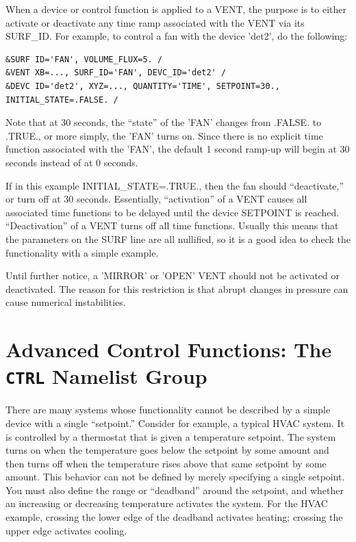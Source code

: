 \documentclass[11pt]{book}
\begin{document}
When a device or control function is applied to a {\ct VENT}, the purpose is to either activate or deactivate any time ramp associated with
the {\ct VENT} via its {\ct SURF\_ID}. For example, to control a fan with the device {\ct 'det2'}, do the following:

\footnotesize
\begin{verbatim}
&SURF ID='FAN', VOLUME_FLUX=5. /
&VENT XB=..., SURF_ID='FAN', DEVC_ID='det2' /
&DEVC ID='det2', XYZ=..., QUANTITY='TIME', SETPOINT=30., INITIAL_STATE=.FALSE. /
\end{verbatim}
\normalsize

\noindent
Note that at 30 seconds, the ``state'' of the {\ct 'FAN'} changes from {\ct .FALSE.} to {\ct .TRUE.}, or more simply, the {\ct 'FAN'} turns on. Since there
is no explicit time function associated with the {\ct 'FAN'}, the default 1 second ramp-up will begin at 30 seconds instead of at 0 seconds.

If in this example {\ct INITIAL\_STATE=.TRUE.}, then the fan should ``deactivate,'' or turn off at 30 seconds. Essentially, ``activation'' of a {\ct VENT} causes all associated
time functions to be delayed until the device {\ct SETPOINT} is reached. ``Deactivation'' of a {\ct VENT} turns off all time functions. Usually this means
that the parameters on the {\ct SURF} line are all nullified, so it is a good idea to check the functionality with a simple example.


\begin{warning}
Until further notice, a {\ct 'MIRROR'} or {\ct 'OPEN'} {\ct VENT} should not be activated or deactivated.
The reason for this restriction is that abrupt changes in pressure can cause numerical instabilities.
\end{warning}



\clearpage

\section{Advanced Control Functions: The \texorpdfstring{{\tt CTRL}}{CTRL} Namelist Group}
\label{info:CTRL}

There are many systems whose functionality cannot be described by a simple device with a single ``setpoint.''
Consider for example, a typical HVAC system.  It is controlled by a thermostat that is given a temperature setpoint.
The system turns on when the temperature goes below the setpoint by some amount and then turns off
when the temperature rises above that same setpoint by some amount.  This behavior can not be defined by merely specifying a single setpoint.
You must also define the range or ``deadband'' around the setpoint, and whether an increasing or decreasing temperature
activates the system.  For the HVAC example, crossing
the lower edge of the deadband activates heating; crossing the upper edge activates cooling.
\end{document}
